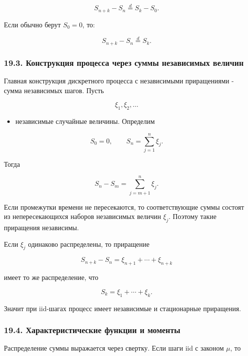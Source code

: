 \documentclass[
  11pt,
  a4paper,
]{article}
\providecommand{\tightlist}{%
  \setlength{\itemsep}{0pt}\setlength{\parskip}{0pt}}
\begin{document}
\[
S_{n+k}-S_n\stackrel d=S_k-S_0.
\]

Если обычно берут \(S_0=0\), то:

\[
S_{n+k}-S_n\stackrel d=S_k.
\]

\subsubsection{19.3. Конструкция процесса через суммы независимых
величин}\label{ux43aux43eux43dux441ux442ux440ux443ux43aux446ux438ux44f-ux43fux440ux43eux446ux435ux441ux441ux430-ux447ux435ux440ux435ux437-ux441ux443ux43cux43cux44b-ux43dux435ux437ux430ux432ux438ux441ux438ux43cux44bux445-ux432ux435ux43bux438ux447ux438ux43d}

Главная конструкция дискретного процесса с независимыми приращениями -
сумма независимых шагов. Пусть

\[
\xi_1,\xi_2,\ldots
\]

\begin{itemize}
\tightlist
\item
  независимые случайные величины. Определим
\end{itemize}

\[
S_0=0,
\qquad
S_n=\sum_{j=1}^n\xi_j.
\]

Тогда

\[
S_n-S_m=\sum_{j=m+1}^n\xi_j.
\]

Если промежутки времени не пересекаются, то соответствующие суммы
состоят из непересекающихся наборов независимых величин \(\xi_j\).
Поэтому такие приращения независимы.

Если \(\xi_j\) одинаково распределены, то приращение

\[
S_{n+k}-S_n=\xi_{n+1}+\cdots+\xi_{n+k}
\]

имеет то же распределение, что

\[
S_k=\xi_1+\cdots+\xi_k.
\]

Значит при iid-шагах процесс имеет независимые и стационарные
приращения.

\subsubsection{19.4. Характеристические функции и
моменты}\label{ux445ux430ux440ux430ux43aux442ux435ux440ux438ux441ux442ux438ux447ux435ux441ux43aux438ux435-ux444ux443ux43dux43aux446ux438ux438-ux438-ux43cux43eux43cux435ux43dux442ux44b}

Распределение суммы выражается через свертку. Если шаги iid с законом
\(\mu\), то
\end{document}
